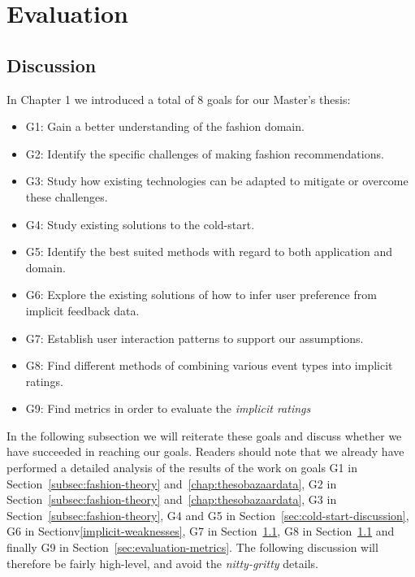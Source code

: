 
\chapter{Evaluation}
\label{chap:resulteval}
\minitoc


\clearpage






\section{Discussion}

In Chapter 1 we introduced a total of 8 goals for our Master's thesis:

\begin{itemize}
\item G1: Gain a better understanding of the fashion domain.
\item G2: Identify the specific challenges of making fashion recommendations.
\item G3: Study how existing technologies can be adapted to mitigate or
  		  overcome these challenges.
\item G4: Study existing solutions to the cold-start.
\item G5: Identify the best suited methods with regard to both application and domain.
\item G6: Explore the existing solutions of how to infer user preference from implicit feedback data.
\item G7: Establish user interaction patterns to support our assumptions.
\item G8: Find different methods of combining various event types into implicit ratings.
\item G9: Find metrics in order to evaluate the \emph{implicit ratings}
\end{itemize}

In the following subsection we will reiterate these goals and discuss whether we have succeeded in reaching our goals. Readers should
note that we already have performed a detailed analysis of the results of the work on goals G1 in Section~\ref{subsec:fashion-theory} and~\ref{chap:thesobazaardata},
G2 in Section~\ref{subsec:fashion-theory} and~\ref{chap:thesobazaardata}, G3 in Section~\ref{subsec:fashion-theory}, G4 and G5 in Section~\ref{sec:cold-start-discussion}, G6 in Sectionv\ref{implicit-weaknesses},
G7 in Section~\ref{}, G8 in Section~\ref{} and finally G9 in Section~\ref{sec:evaluation-metrics}.
The following discussion will therefore be fairly high-level, and avoid the \emph{nitty-gritty} details.

